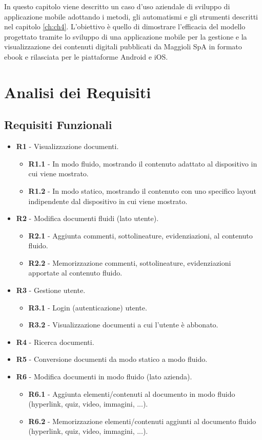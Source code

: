 In questo capitolo viene descritto un caso d'uso aziendale di sviluppo di applicazione mobile adottando i metodi, gli automatismi e gli strumenti descritti nel capitolo \ref{ch:ch4}. L'obiettivo è quello di dimostrare l'efficacia del modello progettato tramite lo sviluppo di una applicazione mobile per la gestione e la visualizzazione dei contenuti digitali pubblicati da Maggioli SpA in formato ebook e rilasciata per le piattaforme Android e iOS.

\section{Analisi dei Requisiti}
\subsection{Requisiti Funzionali}
\begin{itemize}
    \item \textbf{R1} - Visualizzazione documenti.
    \begin{itemize}
        \item \textbf{R1.1} - In modo fluido, mostrando il contenuto adattato al dispositivo in cui viene mostrato.
        \item \textbf{R1.2} - In modo statico, mostrando il contenuto con uno specifico layout indipendente dal dispositivo in cui viene mostrato.
    \end{itemize}
    \item \textbf{R2} - Modifica documenti fluidi (lato utente).
    \begin{itemize}
        \item \textbf{R2.1} - Aggiunta commenti, sottolineature, evidenziazioni, al contenuto fluido.
        \item \textbf{R2.2} - Memorizzazione commenti, sottolineature, evidenziazioni apportate al contenuto fluido.
    \end{itemize}
    \item \textbf{R3} - Gestione utente.
    \begin{itemize}
        \item \textbf{R3.1} - Login (autenticazione) utente.
        \item \textbf{R3.2} - Visualizzazione documenti a cui l'utente è abbonato.
    \end{itemize}
    \item \textbf{R4} - Ricerca documenti.
    \item \textbf{R5} - Conversione documenti da modo statico a modo fluido.
    \item \textbf{R6} - Modifica documenti in modo fluido (lato azienda).
    \begin{itemize}
        \item \textbf{R6.1} - Aggiunta elementi/contenuti al documento in modo fluido (hyperlink, quiz, video, immagini, ...).
        \item \textbf{R6.2} - Memorizzazione elementi/contenuti aggiunti al documento fluido (hyperlink, quiz, video, immagini, ...).
    \end{itemize}
\end{itemize}

